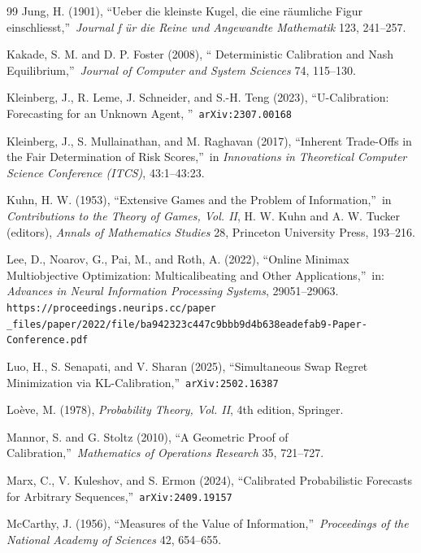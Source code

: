 \documentclass[12pt,a4paper,notitlepage]{article}
\begin{document}
\begin{thebibliography}{99}
\bibitem{} Jung, H. (1901), \textquotedblleft Ueber die kleinste Kugel, die
eine r\"{a}umliche Figur einschliesst,\textquotedblright\ \emph{Journal f%
\"{u}r die Reine und Angewandte Mathematik} 123, 241--257.

\bibitem{} Kakade, S. M. and D. P. Foster (2008), \textquotedblleft
Deterministic Calibration and Nash Equilibrium,\textquotedblright\ 
\emph{Journal of Computer and System Sciences} 74, 115--130.

\bibitem{} Kleinberg, J., R. Leme, J. Schneider, and S.-H. Teng (2023),
\textquotedblleft U-Calibration: Forecasting for an Unknown Agent,
\textquotedblright\ \texttt{arXiv:2307.00168}

\bibitem{} Kleinberg, J., S. Mullainathan, and M. Raghavan (2017),
\textquotedblleft Inherent Trade-Offs in the Fair Determination of Risk
Scores,\textquotedblright\ in \emph{Innovations in Theoretical Computer
Science Conference (ITCS)}, 43:1--43:23.

\bibitem{} Kuhn, H. W. (1953), \textquotedblleft Extensive Games and the
Problem of Information,\textquotedblright\ in \emph{Contributions to the
Theory of Games, Vol. II}, H. W. Kuhn and A. W. Tucker (editors), \emph{%
Annals of Mathematics Studies} 28, Princeton University Press, 193--216.

\bibitem{} Lee, D., Noarov, G., Pai, M., and Roth, A. (2022),
\textquotedblleft Online Minimax Multiobjective Optimization:
Multicalibeating and Other Applications,\textquotedblright\ in: \emph{%
Advances in Neural Information Processing Systems}, 29051--29063. \texttt{%
https://proceedings.neurips.cc/paper%
\_files/paper/2022/file/ba942323c447c9bbb9d4b638eadefab9-Paper-Conference.pdf%
}

\bibitem{} Luo, H., S. Senapati, and V. Sharan (2025),
\textquotedblleft Simultaneous Swap Regret Minimization via
KL-Calibration,\textquotedblright\ \texttt{arXiv:2502.16387}

\bibitem{} Lo\`{e}ve, M. (1978), \emph{Probability Theory, Vol. II}, 4th
edition, Springer.

\bibitem{} Mannor, S. and G. Stoltz (2010), \textquotedblleft A Geometric
Proof of Calibration,\textquotedblright\ \emph{Mathematics of Operations
Research} 35, 721--727.

\bibitem{} Marx, C., V. Kuleshov, and S. Ermon (2024),
\textquotedblleft Calibrated Probabilistic Forecasts for Arbitrary
Sequences,\textquotedblright\ \texttt{arXiv:2409.19157}

\bibitem{} McCarthy, J. (1956), \textquotedblleft Measures of the Value
of Information,\textquotedblright\ \emph{Proceedings of the National
Academy of Sciences} 42, 654--655.


\end{thebibliography}
\end{document}
